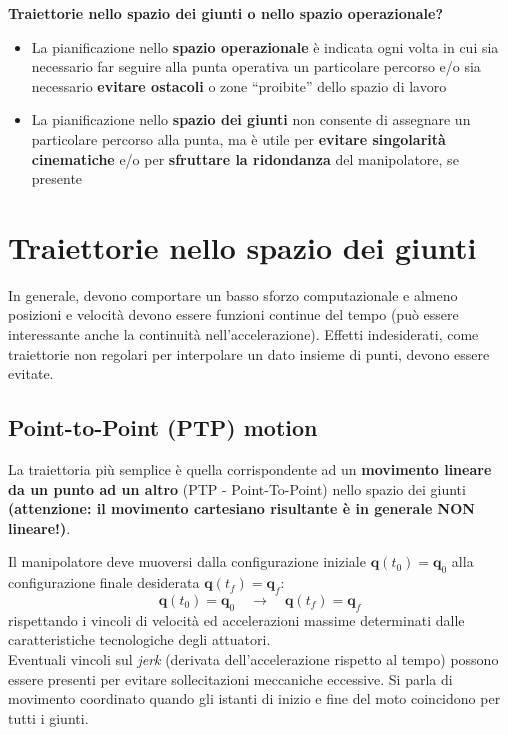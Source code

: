 \vspace*{10pt}
\textbf{Traiettorie nello spazio dei giunti o nello spazio operazionale?}
\begin{itemize}
	\item La pianificazione nello \textbf{spazio operazionale} è indicata ogni volta in cui sia necessario far seguire alla punta operativa un particolare percorso e/o sia necessario \textbf{evitare ostacoli} o zone “proibite” dello spazio di lavoro
	\item La pianificazione nello \textbf{spazio dei giunti} non consente di assegnare un particolare percorso alla punta, ma è utile per \textbf{evitare singolarità cinematiche} e/o per \textbf{sfruttare la ridondanza} del manipolatore, se presente
\end{itemize}






\section{Traiettorie nello spazio dei giunti}

In generale, devono comportare un basso sforzo computazionale e almeno posizioni e velocità devono essere funzioni continue del tempo (può essere interessante anche la continuità nell'accelerazione). Effetti indesiderati, come traiettorie non regolari per interpolare un dato insieme di punti, devono essere evitate.


\subsection{Point-to-Point (PTP) motion}
La traiettoria più semplice è quella corrispondente ad un\textbf{ movimento lineare da un punto ad un altro} (PTP - Point-To-Point) nello spazio dei giunti \textbf{(attenzione: il movimento cartesiano risultante è in generale NON lineare!)}.

Il manipolatore deve muoversi dalla configurazione iniziale $\bm{q}(t_0) = \bm{q}_0$ alla configurazione finale desiderata $\bm{q}(t_f) = \bm{q}_f$:
$$
\bm{q}(t_0) = \bm{q}_0 \quad \longrightarrow \quad \bm{q}(t_f) = \bm{q}_f
$$
rispettando i vincoli di velocità ed accelerazioni massime determinati dalle caratteristiche tecnologiche degli attuatori. \\
Eventuali vincoli sul \textit{jerk} (derivata dell’accelerazione rispetto al tempo) possono essere presenti per evitare sollecitazioni meccaniche eccessive. Si parla di movimento coordinato quando gli istanti di inizio e fine del moto coincidono per tutti i giunti.

